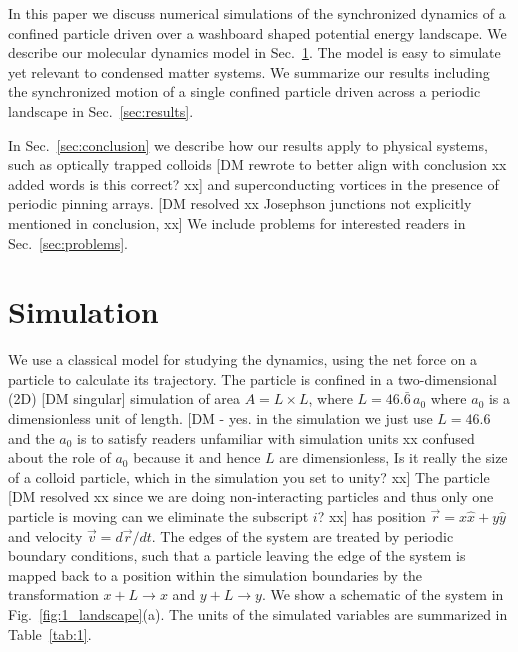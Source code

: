 \documentclass[preprint,showpacs,preprintnumbers,amsmath,amssymb,aps,prb]{revtex4-1}
\theoremstyle{remark}
\begin{document}
In this paper we discuss numerical simulations 
of the synchronized dynamics
of a confined particle driven over
a washboard shaped potential energy landscape.
We describe
our molecular dynamics model  in Sec.~\ref{sec:MD}.
The model
is easy to simulate yet relevant
to condensed matter systems.
We summarize our results 
including the synchronized motion of a single confined particle
driven across a periodic landscape in 
Sec.~\ref{sec:results}.

In Sec.~\ref{sec:conclusion}
we describe how our results apply 
to physical systems,
such as optically trapped colloids
[DM rewrote to better align with conclusion xx added words is this correct? xx]
and superconducting vortices in the presence of periodic pinning arrays.
[DM resolved xx Josephson junctions not explicitly mentioned in conclusion, xx] 
We include problems for interested readers 
in Sec.~\ref{sec:problems}.

\section{Simulation}
\label{sec:MD}
We use a classical model for 
studying the dynamics, %
using the net force on a particle to calculate
its trajectory.
The particle is confined in a two-dimensional (2D) [DM singular]
simulation of area $A = L \times L$, where $L=46.\bar{6}\,a_0$
where $a_0$ is a dimensionless unit of length.
[DM - yes.  in the simulation we just use $L=46.6$ and the $a_0$ is to satisfy readers unfamiliar with simulation units xx confused about the role of $a_0$ because it and hence $L$ are dimensionless, Is it really the size of a colloid particle, which in the simulation you set to unity?  xx]
The particle %
[DM resolved xx since we are doing non-interacting particles and thus only one particle is moving can we eliminate the subscript $i$? xx]
has
position $\vec{r} = x \hat{x} + y \hat{y}$
and velocity $\vec{v} = d\vec{r}/dt$.
The edges of the system are treated by
periodic boundary conditions,
such that a particle leaving the edge of the system is mapped
back to a position within the simulation boundaries 
by the transformation $x+L \rightarrow x$ and $y+L \rightarrow y$.
We show a schematic of the system in Fig.~\ref{fig:1_landscape}(a).
The units of the simulated variables are summarized in Table~\ref{tab:1}.
\end{document}
